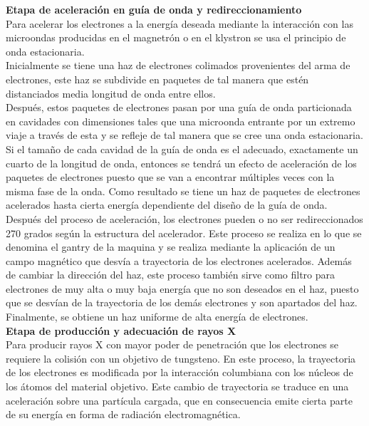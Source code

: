 \textbf{Etapa de aceleración en guía de onda y redireccionamiento}\\

Para acelerar los electrones a la energía deseada mediante la interacción con las microondas producidas en el magnetrón o en el klystron se usa el principio de onda estacionaria. \\

Inicialmente se tiene una haz de electrones colimados provenientes del arma de electrones, este haz se subdivide en paquetes de tal manera que estén distanciados media longitud de onda entre ellos. \\
 
Después, estos paquetes de electrones pasan por una guía de onda particionada en cavidades con dimensiones tales que una microonda entrante por un extremo viaje a través de esta y se refleje de tal manera que se cree una onda estacionaria.  Si el tamaño de cada cavidad de la guía de onda es el adecuado, exactamente un cuarto de la longitud de onda, entonces se tendrá  un efecto de aceleración de los paquetes de electrones puesto que se van a encontrar múltiples veces con la misma fase de la onda. Como resultado se tiene un haz de paquetes de electrones acelerados hasta cierta energía dependiente del diseño de la guía de onda.\\

Después del proceso de aceleración, los electrones pueden o no ser redireccionados 270 grados según la estructura del acelerador. Este proceso se realiza en lo que se denomina el gantry de la maquina y se realiza mediante la aplicación de un campo magnético que desvía a trayectoria de los electrones acelerados. Además de cambiar la dirección del haz, este proceso también sirve como filtro para electrones de muy alta o muy baja  energía que no son deseados en el haz, puesto que se desvían de la trayectoria de los demás electrones y son apartados del haz. Finalmente, se obtiene un haz uniforme de alta energía de electrones. \\ 

\textbf{Etapa de producción y adecuación de rayos X}\\

Para producir rayos X con mayor poder de penetración que los electrones se requiere la colisión con un objetivo de tungsteno. En este proceso, la trayectoria de los electrones es modificada por la interacción columbiana con los núcleos de los átomos del material objetivo. Este cambio de trayectoria se traduce en una aceleración sobre una partícula cargada, que en consecuencia emite cierta parte de su energía en forma de radiación electromagnética. \\

